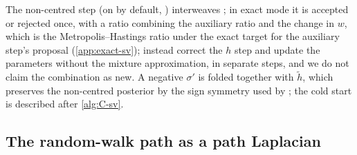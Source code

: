 The non-centred step (on by default, ) interweaves
\citep{yu2011center,kastner2014ancillarity}; in exact mode it is
accepted or rejected once, with a ratio combining the auxiliary ratio and the change in $w$, which
is the Metropolis--Hastings ratio under the exact target for the auxiliary step's proposal
(\cref{app:exact-sv}); \citet{hosszejni2019approaches} instead correct the $h$ step and update the
parameters without the mixture approximation, in separate steps, and we do not claim the combination
as new. %
A negative $\sigma'$ is folded together with $\tilde h$, which preserves the non-centred posterior by the
sign symmetry used by \citet{fruhwirth2010stochastic}; the cold start is described after
\cref{alg:C-sv}. %


\subsection{The random-walk path as a path Laplacian}\label{sec:samp-rw}


